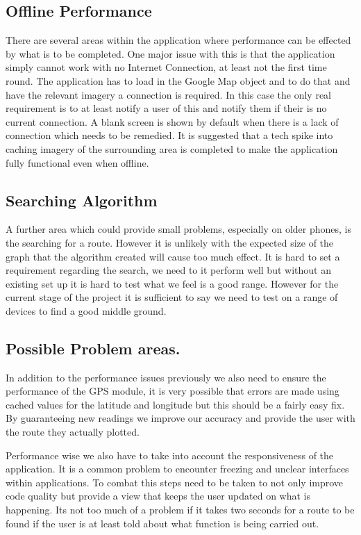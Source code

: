 \subsection{Offline Performance}
There are several areas within the application where performance can be effected by what is to be completed. One major issue with this is that the application simply cannot work with no Internet Connection, at least not the first time round. The application has to load in the Google Map object and to do that and have the relevant imagery a connection is required. In this case the only real requirement is to at least notify a user of this and notify them if their is no current connection. A blank screen is shown by default when there is a lack of connection which needs to be remedied. It is suggested that a tech spike into caching imagery of the surrounding area is completed to make the application fully functional even when offline. 
\subsection{Searching Algorithm}
A further area which could provide small problems, especially on older phones, is the searching for a route. However it is unlikely with the expected size of the graph that the algorithm created will cause too much effect. It is hard to set a requirement regarding the search, we need to it perform well but without an existing set up it is hard to test what we feel is a good range. However for the current stage of the project it is sufficient to say we need to test on a range of devices to find a good middle ground. 
\subsection{Possible Problem areas.}
In addition to the performance issues previously we also need to ensure the performance of the GPS module, it is very possible that errors are made using cached values for the latitude and longitude but this should be a fairly easy fix. By guaranteeing new readings we improve our accuracy and provide the user with the route they actually plotted. 

Performance wise we also have to take into account the responsiveness of the application. It is a common problem to encounter freezing and unclear interfaces within applications. To combat this steps need to be taken to not only improve code quality but provide a view that keeps the user updated on what is happening. Its not too much of a problem if it takes two seconds for a route to be found if the user is at least told about what function is being carried out. 

